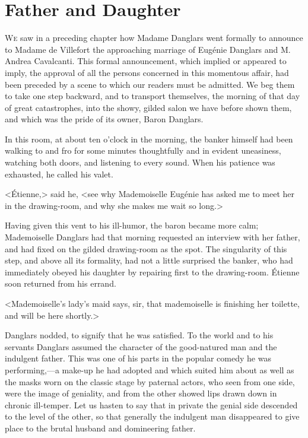 \chapter{Father and Daughter} 

 \lettrine{W}{e} saw in a preceding chapter how Madame Danglars went formally to announce to Madame de Villefort the approaching marriage of Eugénie Danglars and M. Andrea Cavalcanti. This formal announcement, which implied or appeared to imply, the approval of all the persons concerned in this momentous affair, had been preceded by a scene to which our readers must be admitted. We beg them to take one step backward, and to transport themselves, the morning of that day of great catastrophes, into the showy, gilded salon we have before shown them, and which was the pride of its owner, Baron Danglars. 

 In this room, at about ten o'clock in the morning, the banker himself had been walking to and fro for some minutes thoughtfully and in evident uneasiness, watching both doors, and listening to every sound. When his patience was exhausted, he called his valet. 

 <Étienne,> said he, <see why Mademoiselle Eugénie has asked me to meet her in the drawing-room, and why she makes me wait so long.> 

 Having given this vent to his ill-humor, the baron became more calm; Mademoiselle Danglars had that morning requested an interview with her father, and had fixed on the gilded drawing-room as the spot. The singularity of this step, and above all its formality, had not a little surprised the banker, who had immediately obeyed his daughter by repairing first to the drawing-room. Étienne soon returned from his errand. 

 <Mademoiselle's lady's maid says, sir, that mademoiselle is finishing her toilette, and will be here shortly.> 

 Danglars nodded, to signify that he was satisfied. To the world and to his servants Danglars assumed the character of the good-natured man and the indulgent father. This was one of his parts in the popular comedy he was performing,—a make-up he had adopted and which suited him about as well as the masks worn on the classic stage by paternal actors, who seen from one side, were the image of geniality, and from the other showed lips drawn down in chronic ill-temper. Let us hasten to say that in private the genial side descended to the level of the other, so that generally the indulgent man disappeared to give place to the brutal husband and domineering father. 

